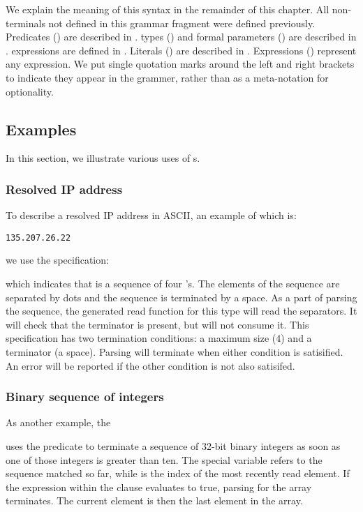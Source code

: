\noindent
We explain the meaning of this syntax in the remainder of this chapter.
All non-terminals not defined in this grammar fragment were
defined previously.
Predicates () are described in .
\padsl{} types () and formal parameters ()
are described in .
\padsl{} expressions  are defined in .
Literals ()  are described in
.
Expressions () represent any \C{} expression.
We put single quotation marks around the left and right brackets to
indicate they appear in the grammer, rather than as a meta-notation
for optionality.

\subsection{Examples}
In this section, we illustrate various uses of \Parray{}s.
\subsubsection{Resolved IP address}
To describe a resolved IP address in ASCII, an example of which is:
\begin{center}
\begin{verbatim}
135.207.26.22
\end{verbatim}
\end{center}
we use the specification:

\noindent
which indicates that \Parray{}  is a sequence of
four 's.  The elements of the sequence are separated by
dots and the sequence is terminated by a space.  As a part of parsing
the sequence, the generated read function for this type will read the
separators.  It will check that the terminator is present, but will
not consume it.  This specification has two termination conditions: a
maximum size (4) and a terminator (a space).  Parsing will terminate
when either condition is satisified.  An error will be reported if the
other condition is not also satisifed.

\subsubsection{Binary sequence of integers}
As another example, the \Parray{} 

\noindent
uses the \Plast{} predicate to terminate a
sequence of 32-bit binary integers as soon as one of those integers is
greater than ten.  The special variable  refers to the
sequence matched so far, while  is the index of the most
recently read element.  If the expression within the \Plast{} clause
evaluates to true, parsing for the array terminates.  The current
element is then the last element in the array.

